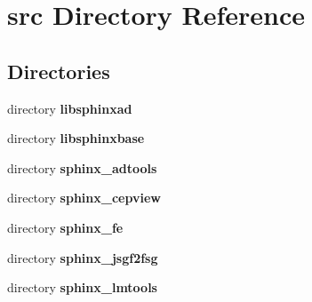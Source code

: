 \section{src Directory Reference}
\label{dir_68267d1309a1af8e8297ef4c3efbcdba}
\subsection*{Directories}
\begin{DoxyCompactItemize}
\item 
directory {\bf libsphinxad}
\item 
directory {\bf libsphinxbase}
\item 
directory {\bf sphinx\+\_\+adtools}
\item 
directory {\bf sphinx\+\_\+cepview}
\item 
directory {\bf sphinx\+\_\+fe}
\item 
directory {\bf sphinx\+\_\+jsgf2fsg}
\item 
directory {\bf sphinx\+\_\+lmtools}
\end{DoxyCompactItemize}
